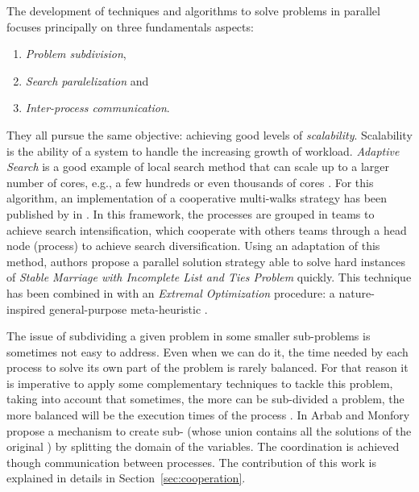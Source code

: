 The development of techniques and algorithms to solve problems in parallel focuses principally on three fundamentals aspects: 
\begin{enumerate}%
    \item {\it Problem subdivision},
    \item {\it Search paralelization} and %
    \item {\it Inter-process communication}.
\end{enumerate}%
They all pursue the same objective: achieving good levels of \textit{scalability}. Scalability is the ability of a system to handle the increasing growth of workload. 
\textit{Adaptive Search} is a good example of local search method that can scale up to a larger number of cores, e.g., a few hundreds or even thousands of cores \cite{Diaz}. For this algorithm, an implementation of a cooperative multi-walks strategy has been published by  in \cite{Munera}. In this framework, the processes are grouped in teams to achieve search intensification, which cooperate with others teams through a head node (process) to achieve search diversification. Using an adaptation of this method, authors propose a parallel solution strategy able to solve hard instances of \textit{Stable Marriage with Incomplete List and Ties Problem} quickly. This technique has been combined in \cite{Munera2016} with an \textit{Extremal Optimization} procedure: a nature-inspired general-purpose meta-heuristic \cite{Boettcher2000}.
	
The issue of subdividing a given problem in some smaller sub-problems is sometimes not easy to address. Even when we can do it, the time needed by each process to solve its own part of the problem is rarely balanced. For that reason it is imperative to apply some complementary techniques to tackle this problem, taking into account that sometimes, the more can be sub-divided a problem, the more balanced will be the execution times of the process \cite{Rezgui2013, Hill}. In \cite{Arbab2000} Arbab and Monfory propose a mechanism to create sub-\csps{} (whose union contains all the solutions of the original \csp) by splitting the domain of the variables. The coordination is achieved though communication between processes. The contribution of this work is explained in details in Section~\ref{sec:cooperation}. 

